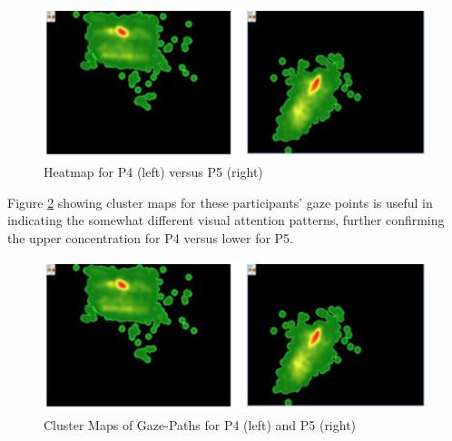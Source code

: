 \documentclass[output=paper]{langsci/langscibook}
\begin{document}
\begin{figure}
 \includegraphics[width=\textwidth]{figures/OHagan6.png}
\caption{Heatmap for P4 (left) versus P5 (right)}
\label{ohagan:fig:6}
\end{figure}

Figure \ref{ohagan:fig:7} showing cluster maps for these participants' gaze points is useful in indicating the somewhat different visual attention patterns, further confirming the upper concentration for P4 versus lower for P5.


  
\begin{figure}
 \includegraphics[width=\textwidth]{figures/OHagan6.png}
 \caption{Cluster Maps of Gaze-Paths for P4 (left) and P5 (right)}
\label{ohagan:fig:7}
\end{figure}
\end{document}

